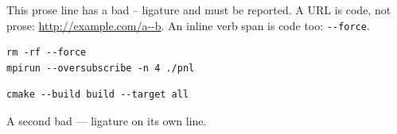 \documentclass{article}
\begin{document}
This prose line has a bad -- ligature and must be reported.
A URL is code, not prose: \url{http://example.com/a--b}.
An inline verb span is code too: \verb|--force|.
\begin{verbatim}
rm -rf --force
mpirun --oversubscribe -n 4 ./pnl
\end{verbatim}
\begin{lstlisting}
cmake --build build --target all
\end{lstlisting}
A second bad --- ligature on its own line.
\end{document}
